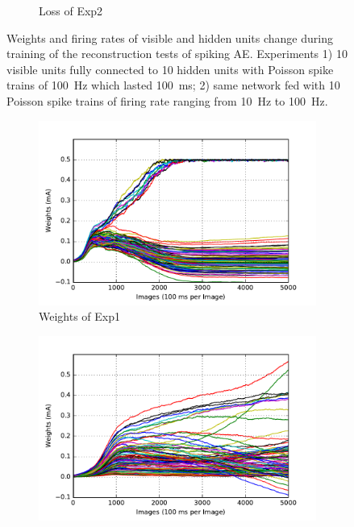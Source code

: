 \begin{figure}
\begin{subfigure}[t]{0.4\textwidth}
		\caption{Loss of Exp2}
	\end{subfigure}
	\caption{Weights and firing rates of visible and hidden units change during training of the reconstruction tests of spiking AE. 
		Experiments 1) 10 visible units fully connected to 10 hidden units with Poisson spike trains of 100~Hz which lasted 100~ms; 2) same network fed with 10 Poisson spike trains of firing rate ranging from 10~Hz to 100~Hz.}
\end{figure}

\begin{figure}
	\centering
	\begin{subfigure}[t]{0.4\textwidth}
		\includegraphics[width=\textwidth]{pics_sdlm/10_exp_SRBM_Orig/exp1_weights_s.pdf}
		\caption{Weights of Exp1}
	\end{subfigure}
	\begin{subfigure}[t]{0.4\textwidth}
		\includegraphics[width=\textwidth]{pics_sdlm/10_exp_SRBM_Orig/exp2_weights_s.pdf}

\end{subfigure}
\end{figure}

